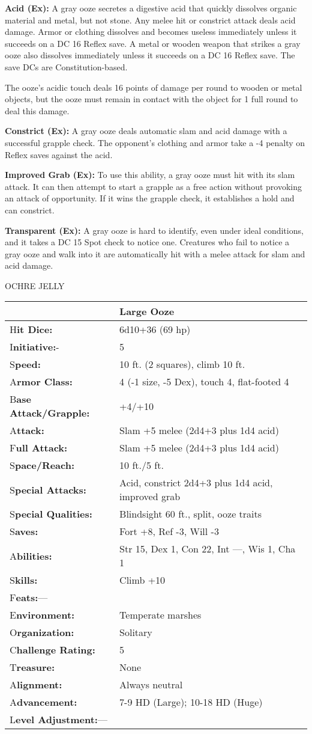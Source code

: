 \documentclass{article}
\begin{document}
\textbf{Acid (Ex): }A gray ooze secretes a digestive acid that quickly dissolves 
organic material and metal, but not stone. Any melee hit or constrict attack deals 
acid damage. Armor or clothing dissolves and becomes useless immediately unless 
it succeeds on a DC 16 Reflex save. A metal or wooden weapon that strikes a gray 
ooze also dissolves immediately unless it succeeds on a DC 16 Reflex save. The 
save DCs are Constitution-based.

The ooze's acidic touch deals 16 points of damage per round to wooden or metal 
objects, but the ooze must remain in contact with the object for 1 full round to 
deal this damage.

\textbf{Constrict (Ex):} A gray ooze deals automatic slam and acid damage with 
a successful grapple check. The opponent's clothing and armor take a -4 penalty 
on Reflex saves against the acid.

\textbf{Improved Grab (Ex): }To use this ability, a gray ooze must hit with its 
slam attack. It can then attempt to start a grapple as a free action without provoking 
an attack of opportunity. If it wins the grapple check, it establishes a hold and 
can constrict. 

\textbf{Transparent (Ex):} A gray ooze is hard to identify, even under ideal conditions, 
and it takes a DC 15 Spot check to notice one. Creatures who fail to notice a gray 
ooze and walk into it are automatically hit with a melee attack for slam and acid 
damage.

\vspace{12pt}
OCHRE JELLY

\begin{tabular}{|>{\raggedright}p{91pt}|>{\raggedright}p{205pt}|}
\hline
  & Large Ooze\tabularnewline
\hline
H\textbf{it Dice:} & 6d10+36 (69 hp)\tabularnewline
\hline
I\textbf{nitiative:}- & 5\tabularnewline
\hline
S\textbf{peed:} & 10 ft. (2 squares), climb 10 ft.\tabularnewline
\hline
A\textbf{rmor Class:} & 4 (-1 size, -5 Dex), touch 4, flat-footed 4\tabularnewline
\hline
B\textbf{ase Attack/Grapple:} & +4/+10\tabularnewline
\hline
A\textbf{ttack:} & Slam +5 melee (2d4+3 plus 1d4 acid)\tabularnewline
\hline
F\textbf{ull Attack:} & Slam +5 melee (2d4+3 plus 1d4 acid)\tabularnewline
\hline
S\textbf{pace/Reach:} & 10 ft./5 ft.\tabularnewline
\hline
S\textbf{pecial Attacks:} & Acid, constrict 2d4+3 plus 1d4 acid, improved grab\tabularnewline
\hline
S\textbf{pecial Qualities:} & Blindsight 60 ft., split, ooze traits\tabularnewline
\hline
S\textbf{aves:} & Fort +8, Ref -3, Will -3\tabularnewline
\hline
A\textbf{bilities:} & Str 15, Dex 1, Con 22, Int ---, Wis 1, Cha 1\tabularnewline
\hline
S\textbf{kills:} & Climb +10\tabularnewline
\hline
F\textbf{eats:}--- & \tabularnewline
\hline
E\textbf{nvironment:} & Temperate marshes\tabularnewline
\hline
O\textbf{rganization:} & Solitary\tabularnewline
\hline
C\textbf{hallenge Rating:} & 5\tabularnewline
\hline
T\textbf{reasure:} & None\tabularnewline
\hline
A\textbf{lignment:} & Always neutral\tabularnewline
\hline
A\textbf{dvancement:} & 7-9 HD (Large); 10-18 HD (Huge)\tabularnewline
\hline
L\textbf{evel Adjustment:}--- & \tabularnewline
\hline
\end{tabular}
\end{document}
